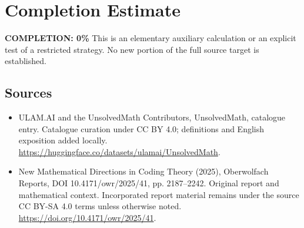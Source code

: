 \documentclass[11pt]{article}
\begin{document}
\section{Completion Estimate}
\noindent\textbf{COMPLETION: 0\%}
This is an elementary auxiliary calculation or an explicit test of a restricted strategy. No new portion of the full source target is established.

\subsection{Sources}
\begin{itemize}
\item[\hypertarget{source:statement:1}{S1}] ULAM.AI and the UnsolvedMath Contributors, UnsolvedMath, catalogue entry. Catalogue curation under CC BY 4.0; definitions and English exposition added locally.
\url{https://huggingface.co/datasets/ulamai/UnsolvedMath}.
\item[\hypertarget{source:statement:2}{S2}] New Mathematical Directions in Coding Theory (2025), Oberwolfach Reports, DOI 10.4171/owr/2025/41, pp. 2187--2242. Original report and mathematical context. Incorporated report material remains under the source CC BY-SA 4.0 terms unless otherwise noted.
\url{https://doi.org/10.4171/owr/2025/41}.
\end{itemize}
\label{end:statement}
\end{document}
